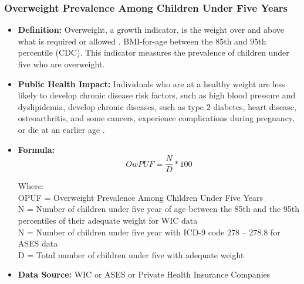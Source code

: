 \documentclass[12pt,letterpaper]{report}
\begin{document}
		\subsubsection{Overweight Prevalence Among Children Under Five Years} 
	\begin{itemize}
		\item \textbf{Definition:}  Overweight, a growth indicator, is the weight over and above what is required or allowed \cite{merriam2004merriam}. BMI-for-age between the 85th and 95th percentile (CDC). This indicator measures the prevalence of children under five who are overweight. 
		
		\item \textbf{Public Health Impact:}  Individuals who are at a healthy weight are less likely to develop chronic disease risk factors, such as high blood pressure and dyslipidemia, develop chronic diseases, such as type 2 diabetes, heart disease, osteoarthritis, and some cancers, experience complications during pregnancy, or die at an earlier age \cite{wyatt2006overweight} \cite{williams2005health} \cite{kopelman2007health} \cite{van1985health}.
		\item \textbf{Formula:} 
			\begin{equation} 
		OwPUF = \frac{N}{D} *100	
			\end{equation} 

Where: \\
	OPUF = Overweight Prevalence Among Children Under Five Years\\
			
			N = Number of children under five year of age between the 85th and the 95th percentiles of their adequate weight for WIC data\\
			N = Number of children under five year with ICD-9 code 278 – 278.8 for ASES data\\
			
			D = Total number of children under five with adequate weight\\
		
		\item \textbf{Data Source:} WIC or ASES or Private Health Insurance Companies
\end{itemize}

\end{document}
